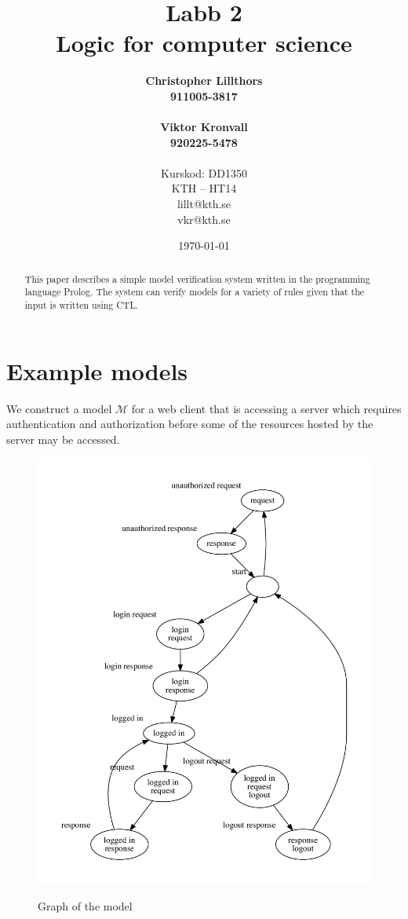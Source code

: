 \documentclass[a4paper,11pt]{article}
\title{Labb 2 \\ Logic for computer science}
\author{
  {\bf Christopher Lillthors}\\
  \textbf{911005-3817} \\\\
  {\bf Viktor Kronvall}\\
  \textbf{920225-5478}\\
  \\
  Kurskod: DD1350\\
  KTH -- HT14\\
  lillt@kth.se\\
  vkr@kth.se
}
\date{\today}
\begin{document}


\maketitle
\thispagestyle{empty}
\begin{abstract}

This paper describes a simple model verification system written in the programming language Prolog.
The system can verify models for a variety of rules given that the input is written using CTL.
\end{abstract}
\renewcommand{\arraystretch}{1.2}
\newpage
\thispagestyle{empty}
\tableofcontents
\newpage
\clearpage
\setcounter{page}{1}


\section{Example models}
\label{models}
We construct a model $\mathcal{M}$ for a web client that is accessing a server which requires authentication and authorization
before some of the resources hosted by the server may be accessed.
\begin{figure}[ht]
\caption{Graph of the model}
\includegraphics[scale=0.6]{model.pdf}
\label{fig:graph}
\end{figure}
\end{document}
